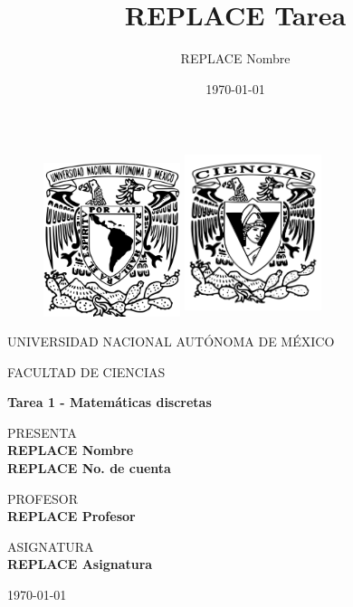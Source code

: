 \documentclass[11pt]{article}
\title{REPLACE Tarea}
\author{REPLACE Nombre}
\date{\today}
\begin{document}
\thispagestyle{empty}
\begin{figure}[ht]
  \includegraphics[width=4cm]{logo_unam.png}
  \label{EscudoUNAM}
  \endminipage
  \includegraphics[height = 4.9cm ,width=4cm]{logo_ciencias.png}
  \label{EscudoFC}
  \endminipage
\end{figure}

\begin{center}
  \vspace{0.8cm}
  \LARGE
  UNIVERSIDAD NACIONAL AUTÓNOMA DE MÉXICO

  \vspace{0.8cm}
  \LARGE
  FACULTAD DE CIENCIAS

  \vspace{1.7cm}
  \Large
  \textbf{Tarea 1 - Matemáticas discretas}

  \vspace{1.3cm}
  \normalsize
  PRESENTA \\
  \vspace{.3cm}
  \large
  \textbf{REPLACE Nombre \\ REPLACE No. de cuenta}

  \vspace{1.3cm}
  \normalsize
  PROFESOR \\
  \vspace{.3cm}
  \large
  \textbf{REPLACE Profesor}

  \vspace{1.3cm}
  \normalsize
  ASIGNATURA \\
  \vspace{.3cm}
  \large
  \textbf{REPLACE Asignatura}

  \vspace{1.3cm}
  \today
\end{center}


\newpage
\end{document}
